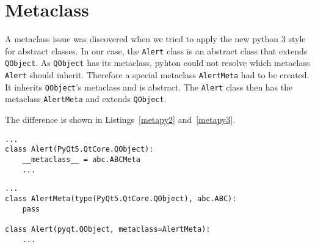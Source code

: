 \section{Metaclass}

A \gls{metaclass} issue was discovered when we tried to apply the new python 3 style
for abstract classes. In our case, the \texttt{Alert} class is an abstract class
that extends \texttt{QObject}. As \texttt{QObject} has its metaclass, pyhton
could not resolve which metaclass \texttt{Alert} should inherit. Therefore a
special metaclass \texttt{AlertMeta} had to be created. It inherits
\texttt{QObject}'s metaclass and is abstract. The \texttt{Alert} class then
has the metaclass \texttt{AlertMeta} and extends
\texttt{QObject}.~\cite{sim2017meta,maries2015meta}

The difference is shown in Listings~\ref{metapy2} and~\ref{metapy3}.

\begin{lstlisting}
...
class Alert(PyQt5.QtCore.QObject):
    __metaclass__ = abc.ABCMeta
    ...
\end{lstlisting}

\begin{lstlisting}
...
class AlertMeta(type(PyQt5.QtCore.QObject), abc.ABC):
    pass

class Alert(pyqt.QObject, metaclass=AlertMeta):
    ...
\end{lstlisting}
